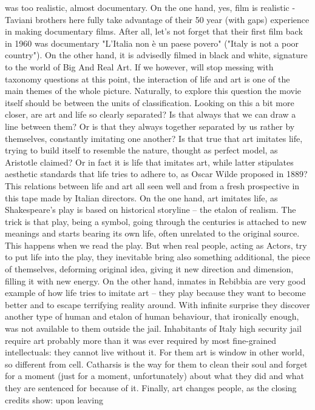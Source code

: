\documentclass[10pt]{article}
\begin{document}
was too realistic, almost documentary. On the one hand, yes, film is realistic - Taviani brothers here fully take advantage of their 50 year
(with gaps) experience in making documentary films. After all, let's not forget that their first film back in 1960 was documentary 
"L'Italia non è un paese povero" ("Italy is not a poor country").
On the other hand, it is advisedly filmed in black and white, signature to the world of Big
And Real Art. If we however, will stop messing with taxonomy questions at this point, the interaction of life and art is one of the main themes
of the whole picture. Naturally, to explore this question the movie itself should be between the units of classification. Looking on this a bit
more closer, are art and life so clearly separated? Is that always that we can draw a line between them? Or is that they always together separated
by us rather by themselves, constantly imitating one another? Is that true that art imitates life, trying to build itself to resemble
the nature, thought as perfect model, as Aristotle claimed? Or in fact it is life that imitates art, while latter stipulates aesthetic
standards that life tries to adhere to, as Oscar Wilde proposed in 1889? This relations between life and art all seen well and from a fresh
prospective in this tape made by Italian directors. On the one hand, art imitates life, as Shakespeare's play is based on historical storyline --
the etalon of realism. The trick is that play, being a symbol, going through the centuries is attached to new meanings and starts bearing
its own life, often unrelated to the original source. This happens when we read the play. But when real people, acting as Actors, try
to put life into the play, they inevitable bring also something additional, the piece of themselves, deforming original idea, giving it new
direction and dimension, filling it with new energy. On the other hand, inmates in Rebibbia are very good example of how life tries to imitate
art -- they play because they want to become better and to escape terrifying reality around. With infinite surprise they discover another type of
human and etalon of human behaviour, that ironically enough, was not available to them outside the jail. Inhabitants of Italy high security jail
require art probably more than it was ever required by most fine-grained intellectuals: they cannot live without it. For them art is window in other
world, so different from cell. Catharsis is the way for them to clean their soul and forget for a moment (just for a moment, unfortunately)
about what they did and what they are sentenced for because of it. Finally, art changes people, as the closing credits show: upon leaving
\end{document}

